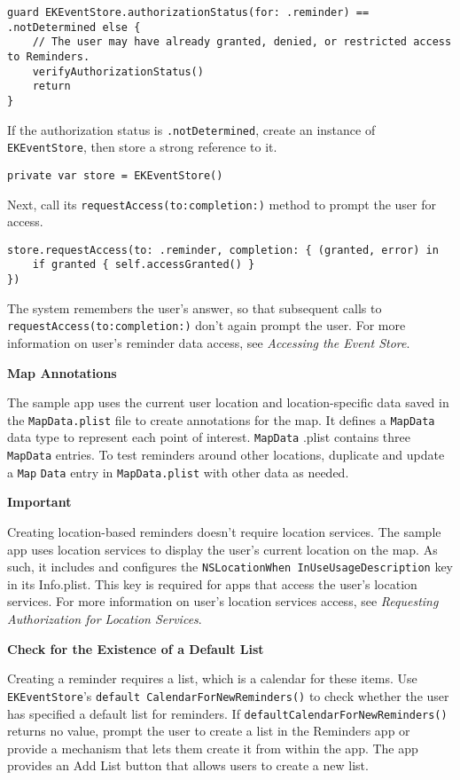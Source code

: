 \documentclass{article}
\begin{document}
\begin{verbatim}
guard EKEventStore.authorizationStatus(for: .reminder) == .notDetermined else {
    // The user may have already granted, denied, or restricted access to Reminders.
    verifyAuthorizationStatus()
    return
}
\end{verbatim}

If the authorization status is \texttt{.notDetermined}, create an instance of \texttt{EKEventStore}, then store a strong
reference to it.

\begin{verbatim}
private var store = EKEventStore()
\end{verbatim}

Next, call its \texttt{requestAccess(to:completion:)} method to prompt the user for access.

\begin{verbatim}
store.requestAccess(to: .reminder, completion: { (granted, error) in
    if granted { self.accessGranted() }
})
\end{verbatim}

The system remembers the user's answer, so that subsequent calls to \texttt{requestAccess(to:completion:)}
don't again prompt the user. For more information on user's reminder data access, see \textit{Accessing the Event
Store}.

\textbf{Map Annotations}

The sample app uses the current user location and location-specific data saved in the \texttt{MapData.plist} file to
create annotations for the map. It defines a \texttt{MapData} data type to represent each point of interest. \texttt{MapData}
.plist contains three \texttt{MapData} entries. To test reminders around other locations, duplicate and update a \texttt{Map}
\texttt{Data} entry in \texttt{MapData.plist} with other data as needed.

\textbf{Important}

Creating location-based reminders doesn't require location services. The sample app uses location services
to display the user's current location on the map. As such, it includes and configures the \texttt{NSLocationWhen
InUseUsageDescription} key in its Info.plist. This key is required for apps that access the user's
location services. For more information on user's location services access, see \textit{Requesting
Authorization for Location Services}.

\textbf{Check for the Existence of a Default List}

Creating a reminder requires a list, which is a calendar for these items. Use \texttt{EKEventStore}'s \texttt{default
CalendarForNewReminders()} to check whether the user has specified a default list for reminders. If
\texttt{defaultCalendarForNewReminders()} returns no value, prompt the user to create a list in the Reminders
app or provide a mechanism that lets them create it from within the app. The app provides an Add List button
that allows users to create a new list.
\end{document}
